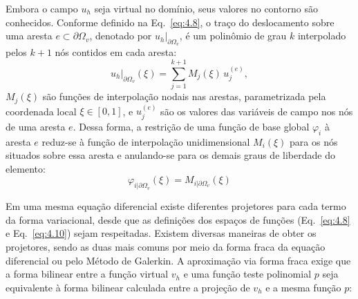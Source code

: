     \indent Embora o campo $u_h$ seja virtual no domínio, seus valores no contorno são conhecidos. Conforme definido na Eq.~\ref{eq:4.8}, o traço do deslocamento sobre uma aresta $e \subset \partial \Omega_v$, denotado por $\left. u_h \right|_{\partial \Omega_v}$, é um polinômio de grau $k$ interpolado pelos $k+1$ nós contidos em cada aresta:
    \begin{equation}
        \left. u_h \right|_{\partial \Omega_v}(\xi) = \sum_{j=1}^{k+1} M_j(\xi) \, u_j^{(e)},
        \label{eq:4.17}
    \end{equation}
    \noindent $M_j(\xi)$ são funções de interpolação nodais nas arestas, parametrizada pela coordenada local $\xi \in [0, 1]$, e $u_j^{(e)}$ são os valores das variáveis de campo nos nós de uma aresta $e$. Dessa forma, a restrição de uma função de base global $\varphi_i$ à aresta $e$ reduz-se à função de interpolação unidimensional $M_i(\xi)$ para os nós situados sobre essa aresta e anulando-se para os demais graus de liberdade do elemento:
    \begin{equation}
        \varphi_{i|\partial \Omega_v}(\xi) = M_{i|\partial \Omega_v}(\xi)
        \label{eq:4.18}
    \end{equation}
    \vspace{5mm}

    \vspace{5mm}

	\indent Em uma mesma equação diferencial existe diferentes projetores para cada termo da forma variacional, desde que as definições dos espaços de funções (Eq.~\ref{eq:4.8} e Eq.~\ref{eq:4.10}) sejam respeitadas. Existem diversas maneiras de obter os projetores, sendo as duas mais comuns por meio da forma fraca da equação diferencial ou pelo Método de Galerkin. A aproximação via forma fraca exige que a forma bilinear entre a função virtual $v_h$ e uma função teste polinomial $p$ seja equivalente à forma bilinear calculada entre a projeção de $v_h$ e a mesma função $p$: 
    

